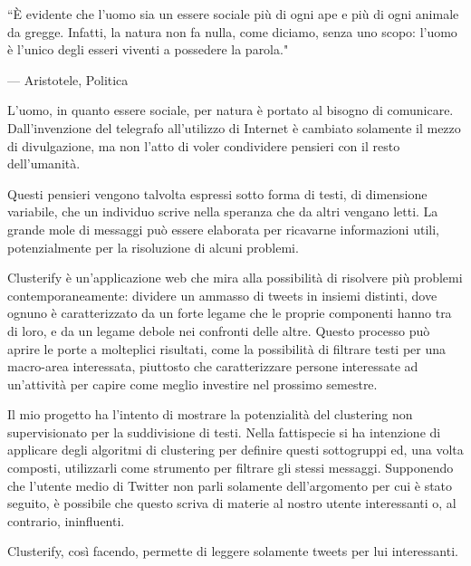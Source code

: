 
\epigraph{``È evidente che l’uomo sia un essere sociale più di ogni ape e più di ogni animale da gregge. Infatti, la natura non fa nulla, come diciamo, senza uno scopo: l’uomo è l’unico degli esseri viventi a possedere la parola."}{--- \textup{Aristotele}, Politica }

L'uomo, in quanto essere sociale, per natura è portato al bisogno di comunicare. Dall'invenzione del telegrafo all'utilizzo di Internet è cambiato solamente il mezzo di divulgazione, ma non l'atto di voler condividere pensieri con il resto dell'umanità.

Questi pensieri vengono talvolta espressi sotto forma di testi, di dimensione variabile, che un individuo scrive nella speranza che da altri vengano letti. La grande mole di messaggi può essere elaborata per ricavarne informazioni utili, potenzialmente per la risoluzione di alcuni problemi.

Clusterify è un'applicazione web che mira alla possibilità di risolvere più problemi contemporaneamente: dividere un ammasso di tweets in insiemi distinti, dove ognuno è caratterizzato da un forte legame che le proprie componenti hanno tra di loro, e da un legame debole nei confronti delle altre. Questo processo può aprire le porte a molteplici risultati, come la possibilità di filtrare testi per una macro-area interessata, piuttosto che caratterizzare persone interessate ad un'attività per capire come meglio investire nel prossimo semestre.

Il mio progetto ha l'intento di mostrare la potenzialità del clustering non supervisionato per la suddivisione di testi. Nella fattispecie si ha intenzione di applicare degli algoritmi di clustering per definire questi sottogruppi ed, una volta composti, utilizzarli come strumento per filtrare gli stessi messaggi. Supponendo che l'utente medio di Twitter non parli solamente dell'argomento per cui è stato seguito, è possibile che questo scriva di materie al nostro utente interessanti o, al contrario, ininfluenti. 

Clusterify, così facendo, permette di leggere solamente tweets per lui interessanti. 